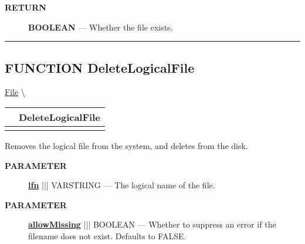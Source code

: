 \par
\begin{description}
\item [\colorbox{tagtype}{\color{white} \textbf{\textsf{RETURN}}}] \textbf{BOOLEAN} --- Whether the file exists.
\end{description}




\rule{\linewidth}{0.5pt}
\subsection*{\textsf{\colorbox{headtoc}{\color{white} FUNCTION}
DeleteLogicalFile}}

\hypertarget{ecldoc:file.deletelogicalfile}{}
\hspace{0pt} \hyperlink{ecldoc:File}{File} \textbackslash 

{\renewcommand{\arraystretch}{1.5}
\begin{tabularx}{\textwidth}{|>{\raggedright\arraybackslash}l|X|}
\hline
\hspace{0pt}\mytexttt{\color{red} } & \textbf{DeleteLogicalFile} \\
\hline
\multicolumn{2}{|>{\raggedright\arraybackslash}X|}{\hspace{0pt}\mytexttt{\color{param} (varstring lfn, boolean allowMissing=FALSE)}} \\
\hline
\end{tabularx}
}

\par





Removes the logical file from the system, and deletes from the disk.






\par
\begin{description}
\item [\colorbox{tagtype}{\color{white} \textbf{\textsf{PARAMETER}}}] \textbf{\underline{lfn}} ||| VARSTRING --- The logical name of the file.
\item [\colorbox{tagtype}{\color{white} \textbf{\textsf{PARAMETER}}}] \textbf{\underline{allowMissing}} ||| BOOLEAN --- Whether to suppress an error if the filename does not exist. Defaults to FALSE.
\end{description}







